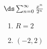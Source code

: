 {$\ds\sum_{n=0}^\infty \frac{x^{n}}{2^n}$
}
{\begin{enumerate}
	\item $R=2$
	\item	$(-2,2)$
\end{enumerate}
}